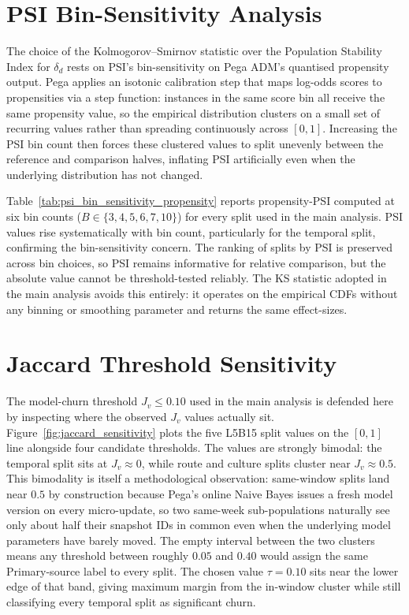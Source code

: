 \documentclass[oneside]{memoir} %
\begin{document}
\section{PSI Bin-Sensitivity Analysis} \label{app:psi_sensitivity}

The choice of the Kolmogorov--Smirnov statistic over the Population Stability Index for $\delta_d$ rests on PSI's bin-sensitivity on Pega ADM's quantised propensity output. Pega applies an isotonic calibration step that maps log-odds scores to propensities via a step function: instances in the same score bin all receive the same propensity value, so the empirical distribution clusters on a small set of recurring values rather than spreading continuously across $[0, 1]$. Increasing the PSI bin count then forces these clustered values to split unevenly between the reference and comparison halves, inflating PSI artificially even when the underlying distribution has not changed.

Table~\ref{tab:psi_bin_sensitivity_propensity} reports propensity-PSI computed at six bin counts ($B \in \{3, 4, 5, 6, 7, 10\}$) for every split used in the main analysis. PSI values rise systematically with bin count, particularly for the temporal split, confirming the bin-sensitivity concern. The ranking of splits by PSI is preserved across bin choices, so PSI remains informative for relative comparison, but the absolute value cannot be threshold-tested reliably. The KS statistic adopted in the main analysis avoids this entirely: it operates on the empirical CDFs without any binning or smoothing parameter and returns the same effect-sizes.



\section{Jaccard Threshold Sensitivity} \label{app:jaccard_sensitivity}

The model-churn threshold $J_v \leq 0.10$ used in the main analysis is defended here by inspecting where the observed $J_v$ values actually sit. Figure~\ref{fig:jaccard_sensitivity} plots the five L5B15 split values on the $[0,1]$ line alongside four candidate thresholds. The values are strongly bimodal: the temporal split sits at $J_v \approx 0$, while route and culture splits cluster near $J_v \approx 0.5$. This bimodality is itself a methodological observation: same-window splits land near $0.5$ by construction because Pega's online Naive Bayes issues a fresh model version on every micro-update, so two same-week sub-populations naturally see only about half their snapshot IDs in common even when the underlying model parameters have barely moved. The empty interval between the two clusters means any threshold between roughly $0.05$ and $0.40$ would assign the same Primary-source label to every split. The chosen value $\tau=0.10$ sits near the lower edge of that band, giving maximum margin from the in-window cluster while still classifying every temporal split as significant churn.
\end{document}
